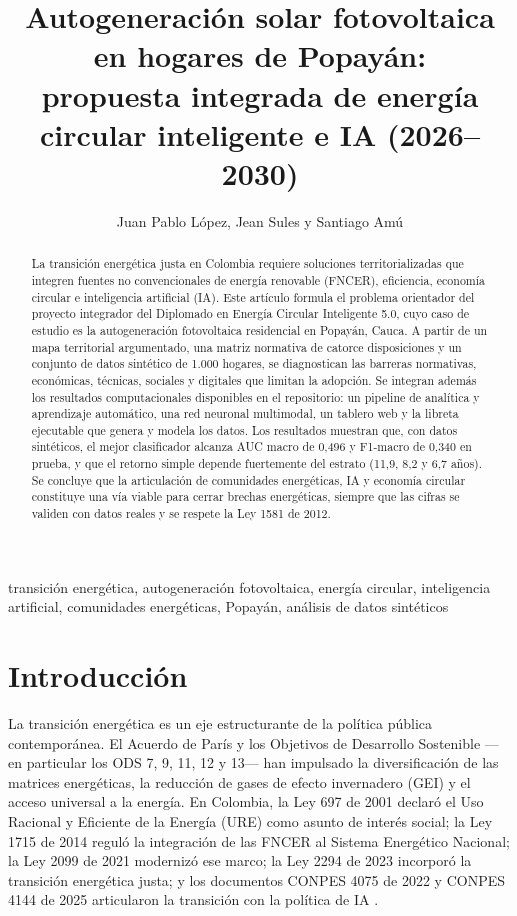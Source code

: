 \documentclass[journal]{IEEEtran}
\title{Autogeneración solar fotovoltaica en hogares de Popayán:\\
propuesta integrada de energía circular inteligente e IA (2026--2030)}
\author{Juan Pablo López, Jean Sules y Santiago Amú\IEEEauthorblockA{Diplomado en Energía Circular Inteligente 5.0\\
Facultad de Ingeniería -- Unicomfacauca\\
Popayán, Cauca, Colombia}}
\begin{document}
\maketitle

\begin{abstract}
La transición energética justa en Colombia requiere soluciones territorializadas que integren fuentes no convencionales de energía renovable (FNCER), eficiencia, economía circular e inteligencia artificial (IA). Este artículo formula el problema orientador del proyecto integrador del Diplomado en Energía Circular Inteligente 5.0, cuyo caso de estudio es la autogeneración fotovoltaica residencial en Popayán, Cauca. A partir de un mapa territorial argumentado, una matriz normativa de catorce disposiciones y un conjunto de datos sintético de 1.000 hogares, se diagnostican las barreras normativas, económicas, técnicas, sociales y digitales que limitan la adopción. Se integran además los resultados computacionales disponibles en el repositorio: un pipeline de analítica y aprendizaje automático, una red neuronal multimodal, un tablero web y la libreta ejecutable que genera y modela los datos. Los resultados muestran que, con datos sintéticos, el mejor clasificador alcanza AUC macro de 0,496 y F1-macro de 0,340 en prueba, y que el retorno simple depende fuertemente del estrato (11,9, 8,2 y 6,7 años). Se concluye que la articulación de comunidades energéticas, IA y economía circular constituye una vía viable para cerrar brechas energéticas, siempre que las cifras se validen con datos reales y se respete la Ley 1581 de 2012.
\end{abstract}

\begin{IEEEkeywords}
transición energética, autogeneración fotovoltaica, energía circular, inteligencia artificial, comunidades energéticas, Popayán, análisis de datos sintéticos
\end{IEEEkeywords}

\section{Introducción}
La transición energética es un eje estructurante de la política pública contemporánea. El Acuerdo de París y los Objetivos de Desarrollo Sostenible ---en particular los ODS 7, 9, 11, 12 y 13--- han impulsado la diversificación de las matrices energéticas, la reducción de gases de efecto invernadero (GEI) y el acceso universal a la energía. En Colombia, la Ley 697 de 2001 declaró el Uso Racional y Eficiente de la Energía (URE) como asunto de interés social; la Ley 1715 de 2014 reguló la integración de las FNCER al Sistema Energético Nacional; la Ley 2099 de 2021 modernizó ese marco; la Ley 2294 de 2023 incorporó la transición energética justa; y los documentos CONPES 4075 de 2022 y CONPES 4144 de 2025 articularon la transición con la política de IA \cite{r1,r2,r3,r4,r6,r7}.
\end{document}
